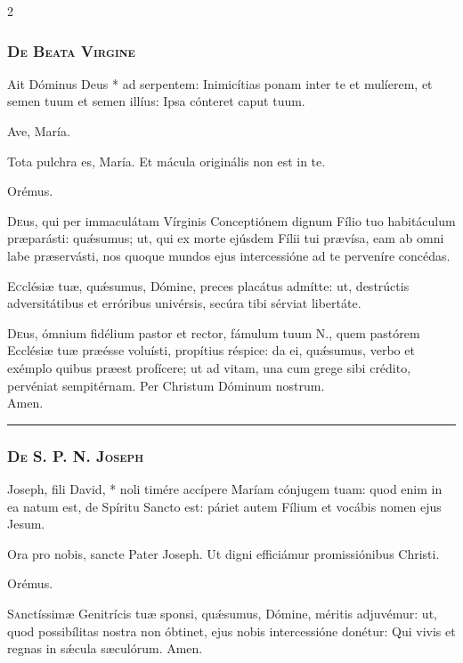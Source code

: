 \documentclass[9pt,twoside]{extarticle}
\begin{document}
\begin{multicols}{2}
\subsubsection*{\center \textsc{De Beata Virgine}}
\begin{tightlist}{}
\item {} Ait Dóminus Deus * ad serpentem: Inimicítias ponam inter te et mulíerem, et semen tuum et semen illíus: Ipsa cónteret caput tuum.
\item {\small {} Ave, María.}
\item {} Tota pulchra es, María.  Et mácula originális non est in te.
\item Orémus. \hfill {}
\end{tightlist}
\lettrine{D}eus, qui per immaculátam Vírginis Conceptiónem dignum Fílio tuo habitáculum præparásti: quǽsumus; ut, qui ex morte ejúsdem Fílii tui prævísa, eam ab omni labe præservásti, nos quoque mundos ejus intercessióne ad te perveníre concédas.

\lettrine{E}cclésiæ tuæ, quǽsumus, Dómine, preces placátus admítte: ut, destrúctis adversitátibus et erróribus univérsis, secúra tibi sérviat libertáte.

\lettrine{D}eus, ómnium fidélium pastor et rector, fámulum tuum N., quem pastórem Ecclésiæ tuæ præésse voluísti, propítius réspice: da ei, quǽsumus, verbo et exémplo quibus præest profícere; ut ad vitam, una cum grege sibi crédito, pervéniat sempitérnam. Per Christum Dóminum nostrum.\\
 Amen.

\begin{center}\textcolor{red}{\rule{\linewidth}{0.5pt}} \end{center}

\subsubsection*{\center \textsc{De S. P. N. Joseph}}
\begin{tightlist}{}
\item {} Joseph, fili David, * noli timére accípere Maríam cónjugem tuam: quod enim in ea natum est, de Spíritu Sancto est: páriet autem Fílium et vocábis nomen ejus Jesum.
\item {} Ora pro nobis, sancte Pater Joseph.  Ut digni efficiámur promissiónibus Christi.
\item Orémus. \hfill {}
\end{tightlist}
\lettrine{S}anctíssimæ Genitrícis tuæ sponsi, quǽsumus, Dómine, méritis adjuvémur: ut, quod possibílitas nostra non óbtinet, ejus nobis intercessióne donétur: Qui vivis et regnas in sǽcula sæculórum.  Amen.


\end{multicols}
\end{document}
